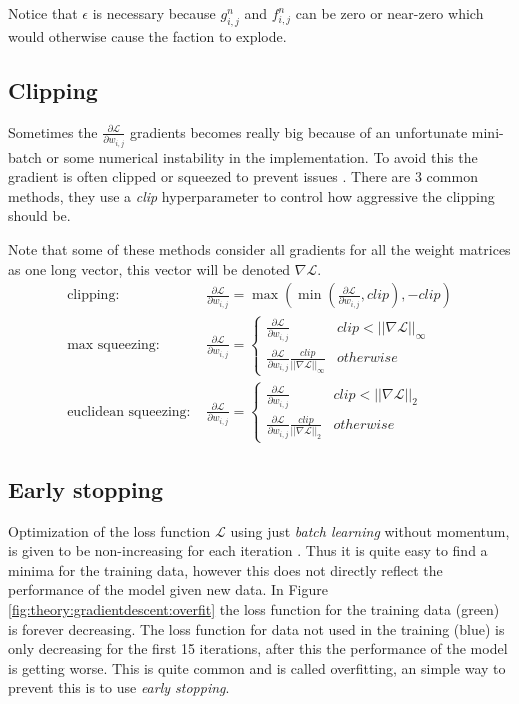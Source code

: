 Notice that $\epsilon$ is necessary because $g_{i,j}^n$ and $f_{i,j}^n$ can be zero or near-zero which would otherwise cause the faction to explode.

\subsection{Clipping}

Sometimes the $\frac{\partial \mathcal{L}}{\partial w_{i,j}}$ gradients becomes really big because of an unfortunate mini-batch or some numerical instability in the implementation. To avoid this the gradient is often clipped or squeezed to prevent issues \cite{graves-generating-sequences}. There are 3 common methods, they use a \textit{clip} hyperparameter to control how aggressive the clipping should be.

Note that some of these methods consider all gradients for all the weight matrices as one long vector, this vector will be denoted $\nabla \mathcal{L}$.
\begin{align}
\text{clipping: } & \frac{\partial \mathcal{L}}{\partial w_{i,j}} = \max\left(\min\left(\frac{\partial \mathcal{L}}{\partial w_{i,j}}, clip\right), - clip \right) \\
\text{max squeezing: } & \frac{\partial \mathcal{L}}{\partial w_{i,j}} = \begin{cases}
	\frac{\partial \mathcal{L}}{\partial w_{i,j}} & clip < ||\nabla \mathcal{L}||_{\infty} \\
	\frac{\partial \mathcal{L}}{\partial w_{i,j}} \frac{clip}{||\nabla \mathcal{L}||_{\infty}} & otherwise
\end{cases} \\
\text{euclidean squeezing: } & \frac{\partial \mathcal{L}}{\partial w_{i,j}} = \begin{cases}
	\frac{\partial \mathcal{L}}{\partial w_{i,j}} & clip < ||\nabla \mathcal{L}||_2 \\
	\frac{\partial \mathcal{L}}{\partial w_{i,j}} \frac{clip}{||\nabla \mathcal{L}||_2} & otherwise
\end{cases}
\end{align}

\subsection{Early stopping}

Optimization of the loss function $\mathcal{L}$ using just \textit{batch learning} without momentum, is given to be non-increasing for each iteration \cite{bishop}. Thus it is quite easy to find a minima for the training data, however this does not directly reflect the performance of the model given new data. In Figure \ref{fig:theory:gradientdescent:overfit} the loss function for the training data (green) is forever decreasing. The loss function for data not used in the training (blue) is only decreasing for the first 15 iterations, after this the performance of the model is getting worse. This is quite common and is called overfitting, an simple way to prevent this is to use \textit{early stopping}.

